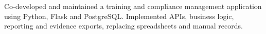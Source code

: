 Co-developed and maintained a training and compliance management application using Python, Flask and PostgreSQL. Implemented APIs, business logic, reporting and evidence exports, replacing spreadsheets and manual records.
